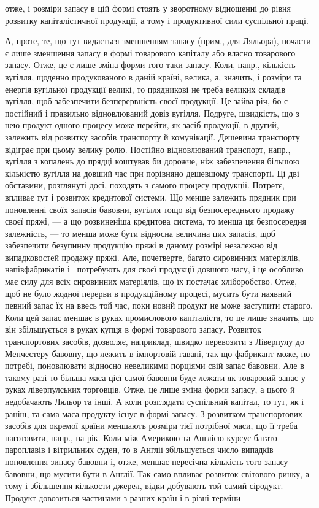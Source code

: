 \parcont{}  %
отже, і розміри запасу в цій формі стоять у зворотному відношенні до
рівня розвитку капіталістичної продукції, а тому і продуктивної сили
суспільної праці.

А, проте, те, що тут видається зменшенням запасу (прим., для Ляльора),
почасти є лише зменшення запасу в формі товарового капіталу або
власно товарового запасу. Отже, це є лише зміна форми того таки запасу.
Коли, напр., кількість вугілля, щоденно продукованого в даній країні,
велика, а, значить, і розміри та енергія вугільної продукції великі, то
прядникові не треба великих складів вугілля, щоб забезпечити безперервність
своєї продукції. Це зайва річ, бо є постійний і правильно
відновлюваний довіз вугілля. Подруге, швидкість, що з нею продукт
одного процесу може перейти, як засіб продукції, в другий, залежить
від розвитку засобів транспорту й комунікації. Дешевина транспорту
відіграє при цьому велику ролю. Постійно відновлюваний транспорт,
напр., вугілля з копалень до прядці коштував би дорожче, ніж забезпечення
більшою кількістю вугілля на довший час при порівняно дешевшому
транспорті. Ці дві обставини, розглянуті досі, походять з самого процесу
продукції. Потретє, впливає тут і розвиток кредитової системи. Що менше
залежить прядник при поновленні своїх запасів бавовни, вугілля тощо від
безпосереднього продажу своєї пряжі, — а що розвиненіша кредитова система,
то менша ця безпосередня залежність, — то менша може бути відносна
величина цих запасів, щоб забезпечити безупинну продукцію пряжі
в даному розмірі незалежно від випадковостей продажу пряжі. Але,
почетверте, багато сировинних матеріялів, напівфабрикатів і~ потребують
для своєї продукції довшого часу, і це особливо має силу для
всіх сировинних матеріялів, що їх постачає хліборобство. Отже, щоб не
було жодної перерви в продукційному процесі, мусить бути наявний
певний запас їх на ввесь той час, поки новий продукт не може заступити
старого. Коли цей запас меншає в руках промислового капіталіста,
то це лише значить, що він збільшується в руках купця в
формі товарового запасу. Розвиток транспортових засобів, дозволяє, наприклад,
швидко перевозити з Ліверпулу до Менчестеру бавовну, що
лежить в імпортовій гавані, так що фабрикант може, по потребі, поновлювати
відносно невеликими порціями свій запас бавовни. Але в такому
разі то більша маса цієї самої бавовни буде лежати як товаровий
запас у руках ліверпулських торговців. Отже, це лише зміна форми запасу,
а цього й недобачають Ляльор та інші. А коли розглядати суспільний
капітал, то тут, як і раніш, та сама маса продукту існує в формі
запасу. З розвитком транспортових засобів для окремої країни меншають
розміри тієї потрібної маси, що її треба наготовити, напр., на рік.
Коли між Америкою та Англією курсує багато пароплавів і вітрильних
суден, то в Англії збільшується число випадків поновлення зипасу бавовни
і, отже, меншає пересічна кількість того запасу бавовни, що мусити
бути в Англії. Так само впливає розвиток світового ринку, а
тому і збільшення кількости джерел, відки добувають той самий
сіродукт. Продукт довозиться частинами з разних країн і в різні терміни
\parbreak{}  %
